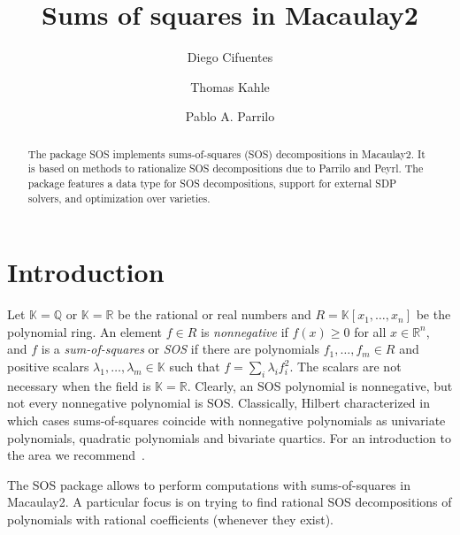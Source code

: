 \documentclass[11pt]{amsart}
\theoremstyle{plain}%
\theoremstyle{definition}
\theoremstyle{remark}
\newcommand{\Mac}{Macaulay2\xspace}
\newcommand{\SOS}{\textsc{SOS}\xspace}
\newcommand{\QQ}{\mathbb{Q}}
\newcommand{\RR}{\mathbb{R}}
\newcommand{\kk}{\mathbb{K}}
\begin{document}
\title[Sums of squares in Macaulay2]{Sums of squares in Macaulay2}

\author{Diego Cifuentes}
\address{Massachusetts Institute of Technology \\ Cambridge, MA, USA}

\author{Thomas Kahle}
\address{Otto-von-Guericke University \\ Magdeburg, Germany}

\author{Pablo A. Parrilo}
\address{Massachusetts Institute of Technology \\ Cambridge, MA, USA}


\begin{abstract}
  The package \SOS implements sums-of-squares (SOS) decompositions in
  \Mac.
  It is based on methods to rationalize SOS decompositions due to Parrilo and Peyrl.
  The package features a data type for SOS decompositions, support for external SDP solvers, and optimization over varieties.
\end{abstract}

\maketitle

\section{Introduction}
\label{s:intro}

Let $\kk \!=\! \QQ$ or $\kk \!=\! \RR$ be the rational or real numbers and $R = \kk[x_{1},\dots,x_{n}]$ be the polynomial ring.
An element $f\!\in\! R$ is \emph{nonnegative} if $f(x) \!\ge\! 0$ for all $x \!\in\! \RR^{n}$,
and $f$ is a \emph{sum-of-squares} or \emph{SOS} if there are polynomials $f_{1},\dots,f_{m} \!\in\! R$ and positive scalars $\lambda_{1},\dots,\lambda_{m} \!\in\! \kk$ such that $f=\sum_{i}\lambda_i f_{i}^{2}$.
The scalars are not necessary when the field is $\kk\!=\!\RR$.
Clearly, an SOS polynomial is nonnegative, but not every nonnegative polynomial is SOS.
Classically, Hilbert characterized in which cases sums-of-squares coincide with nonnegative polynomials as univariate polynomials, quadratic polynomials and bivariate quartics.  
For an introduction to the area we recommend~\cite{scheiderer2009positivity,blekherman2012semidefinite}.

The \SOS package allows to perform computations with sums-of-squares in \Mac.
A particular focus is on trying to find rational SOS decompositions of polynomials with rational coefficients (whenever they exist).
\end{document}

